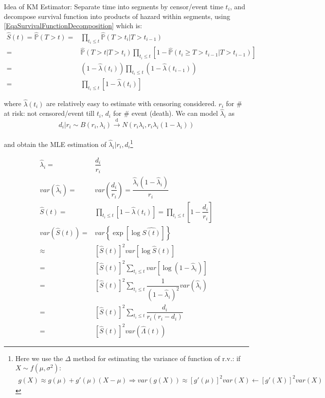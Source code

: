 Idea of KM Estimator: Separate time into segments by censor/event time $ t_i $, and decompose survival function into products of hazard within segments, using \autoref{EqaSurvivalFunctionDecomposition} which is:
\begin{align}
    \hat{S}(t)=\hat{\mathbb{P}}(T>t)=&\prod_{t_i\leq t}\hat{\mathbb{P}}\left( T>t_i |T>t_{i-1}  \right) \\
    =&\hat{\mathbb{P}}\left( T>t|T>t_i \right)  \prod_{t_i\leq t}\left[1- \hat{\mathbb{P}}\left( t_{i}\geq T>t_{i-1} |T>t_{i-1}\right) \right]\\
    =&\left(1-\hat{\lambda }(t_i)\right)\prod_{t_i\leq t}\left(1-\hat{\lambda }(t_{i-1})\right)\\
    =&\prod_{t_i\leq t}\left[1-\hat{\lambda }(t_i)\right]
\end{align}

where $ \hat{\lambda }(t_i) $ are relatively easy to estimate with censoring considered. $ r_i $ for \# at risk: not censored/event till $ t_i $, $ d_i $ for \# event (death). We can model $ \hat{\lambda }_i $ as
\begin{equation}
    d_i\big|r_i \sim B(r_i,\lambda _i)\xrightarrow[]{\mathrm{d}} N(r_i\lambda _i,r_i\lambda _i(1-\lambda _i))
\end{equation}

and obtain the MLE estimation of $ \hat{\lambda }_i|r_i,d_i $\footnote{Here we use the $ \Delta  $ method for estimating the variance of function of r.v.: if $ X\sim f(\mu ,\sigma ^2) $:
\begin{align}
    g(X)\approx g(\mu )+g'(\mu )(X-\mu )\Rightarrow var(g(X))\approx [g'(\mu )]^2var(X)\leftarrow [g'(X)]^2var(X)
\end{align}}

\begin{align}
    \hat{\lambda }_i=&\dfrac{d_i}{r_i}\\
    var(\hat{\lambda }_i)=&var(\dfrac{d_i}{r_i})=\dfrac{\hat{\lambda }_i(1-\hat{\lambda }_i)}{r_i}\\
    \hat{S}(t)=&\prod_{t_i\leq t}\left[1-\hat{\lambda }(t_i)\right]=\prod_{t_i\leq t}\left[1-\dfrac{d_i}{r_i}\right]\tag{KM Estimator}\\
    var(\hat{S}(t))=&var\left\{ \exp\left[ \log\hat{S(t)} \right] \right\}\\
    \approx&[\hat{S}(t)]^2var\left[\log \hat{S}(t)\right]\\
    =&[\hat{S}(t)]^2\sum_{t_i\leq t}var\left[\log (1-\hat{\lambda }_i) \right]\\
    =&[\hat{S}(t)]^2\sum_{t_i\leq t}\dfrac{1}{(1-\hat{\lambda }_i)^2}var(\hat{\lambda }_i)\\
    =&[\hat{S}(t)]^2\sum_{t_i\leq t}\dfrac{d_i}{r_i(r_i-d_i)}\tag{Greenwood' Formula}\\
    =&[\hat{S}(t)]^2var(\hat{\Lambda }(t))
\end{align}

